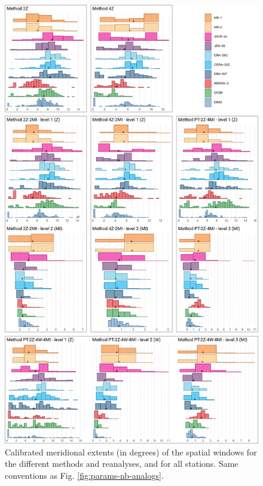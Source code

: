 \documentclass[alpha-refs]{wiley-article}
\begin{document}
\begin{figure}[btp]
	\centering
	\includegraphics[width=115mm]{figure-5.pdf}
	\caption{Calibrated meridional extents (in degrees) of the spatial windows for the different methods and reanalyses, and for all stations. Same conventions as Fig. \protect\ref{fig:params-nb-analogs}.}
	\label{fig:params-ywidth}
\end{figure}
\end{document}
